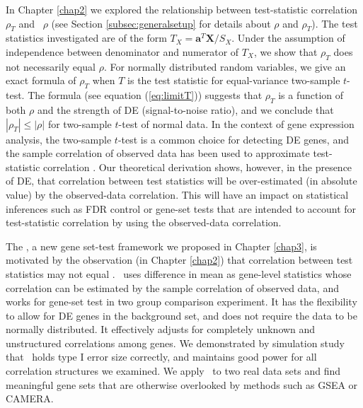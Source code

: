 In Chapter \ref{chap2} we explored the relationship between test-statistic correlation $\rho_T$
and \popucor~$\rho$ (see Section \ref{subsec:generalsetup} for details about $\rho$ and 
$\rho_T$). The test statistics investigated are of the form $T_X = \bm a^T\bm 
X/S_X$. Under the assumption of independence between denominator and numerator of $T_X$, we show 
that $\rho_T$ does not necessarily equal $\rho$. For normally distributed 
random variables, we give an exact formula of $\rho_T$ when $T$ is the test statistic for 
equal-variance two-sample $t$-test. The formula (see equation (\ref{eq:limitT})) suggests that 
$\rho_T$ is a function of both $\rho$ and the strength of DE (signal-to-noise ratio), and we 
conclude that $|\rho_T|\leq 
|\rho|$ for two-sample $t$-test of normal data. In the context of gene expression analysis, the 
two-sample $t$-test is a common choice for 
detecting DE genes, and the sample correlation of observed data has been used to approximate 
test-statistic correlation \cite{barry2008statistical,efron2007correlation,wu2012camera}. Our 
theoretical derivation shows, however, in the presence of DE, that correlation between test 
statistics will be over-estimated (in absolute value) by the observed-data correlation. This will 
have an impact on statistical inferences such as 
FDR control or gene-set tests that are intended to account for test-statistic
correlation by using the observed-data correlation.

The \OurMethod, a new gene set-test framework we proposed in Chapter \ref{chap3}, is motivated by 
the observation (in Chapter \ref{chap2}) that correlation between test statistics may not equal 
\popucor. \OurMethod~uses difference in mean as gene-level statistics whose correlation can be 
estimated by the sample correlation of observed data, and works for gene-set test in two group 
comparison experiment. It has the flexibility to allow for DE genes in the 
background set, and does not require the data to be normally distributed. It effectively adjusts 
for completely unknown and unstructured correlations among genes. 
 We demonstrated by simulation study that \OurMethod~holds type I error size 
correctly, and maintains good power for all correlation structures we examined. We apply 
\OurMethod~to two real data sets and find meaningful gene sets that are otherwise overlooked by 
methods such as GSEA or CAMERA.


